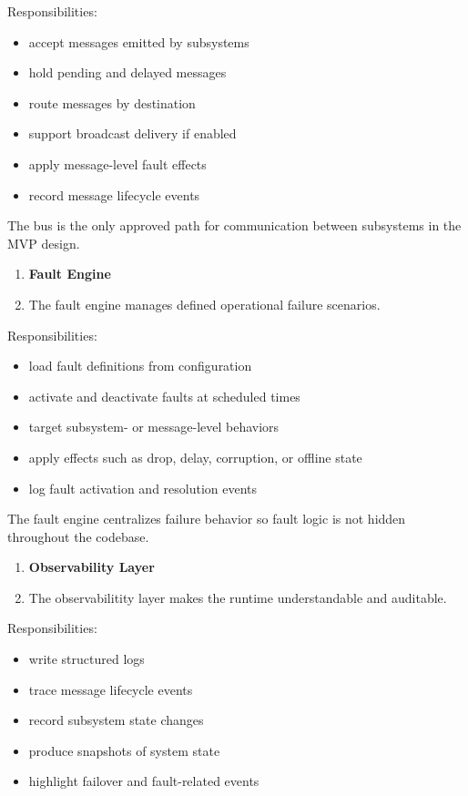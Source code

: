\documentclass[12pt]{article}
\begin{document}
Responsibilities:
\begin{itemize}[leftmargin=*]
    \item accept messages emitted by subsystems
    \item hold pending and delayed messages
    \item route messages by destination
    \item support broadcast delivery if enabled
    \item apply message-level fault effects
    \item record message lifecycle events
\end{itemize}

The bus is the only approved path for communication between subsystems in the MVP design.

\begin{enumerate}[start=3]
    \item \textbf{Fault Engine}
    \item[] The fault engine manages defined operational failure scenarios.
\end{enumerate}

Responsibilities:
\begin{itemize}[leftmargin=*]
    \item load fault definitions from configuration
    \item activate and deactivate faults at scheduled times
    \item target subsystem- or message-level behaviors
    \item apply effects such as drop, delay, corruption, or offline state
    \item log fault activation and resolution events
\end{itemize}

The fault engine centralizes failure behavior so fault logic is not hidden throughout the codebase.
\begin{enumerate}[start=4]
    \item \textbf{Observability Layer}
    \item[] The observabilitity layer makes the runtime understandable and auditable.
\end{enumerate}

Responsibilities:
\begin{itemize}[leftmargin=*]
    \item write structured logs
    \item trace message lifecycle events
    \item record subsystem state changes
    \item produce snapshots of system state
    \item highlight failover and fault-related events
\end{itemize}
\end{document}
